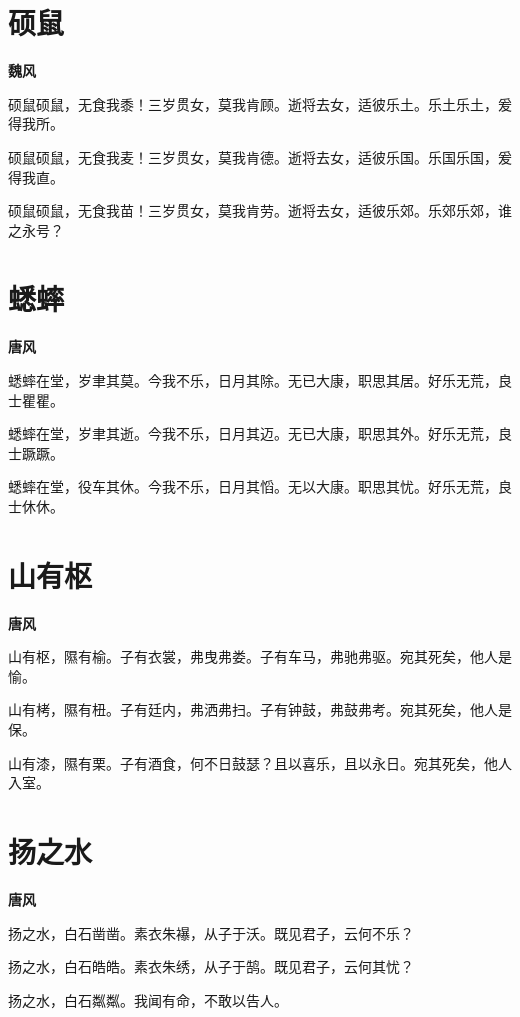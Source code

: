 \documentclass[12pt,a4paper]{ctexbook}
\begin{document}
\section{硕鼠}
\textbf{魏风}\par\vspace{0.5em}
硕鼠硕鼠，无食我黍！三岁贯女，莫我肯顾。逝将去女，适彼乐土。乐土乐土，爰得我所。\par
硕鼠硕鼠，无食我麦！三岁贯女，莫我肯德。逝将去女，适彼乐国。乐国乐国，爰得我直。\par
硕鼠硕鼠，无食我苗！三岁贯女，莫我肯劳。逝将去女，适彼乐郊。乐郊乐郊，谁之永号？\par

\section{蟋蟀}
\textbf{唐风}\par\vspace{0.5em}
蟋蟀在堂，岁聿其莫。今我不乐，日月其除。无已大康，职思其居。好乐无荒，良士瞿瞿。\par
蟋蟀在堂，岁聿其逝。今我不乐，日月其迈。无已大康，职思其外。好乐无荒，良士蹶蹶。\par
蟋蟀在堂，役车其休。今我不乐，日月其慆。无以大康。职思其忧。好乐无荒，良士休休。\par

\section{山有枢}
\textbf{唐风}\par\vspace{0.5em}
山有枢，隰有榆。子有衣裳，弗曳弗娄。子有车马，弗驰弗驱。宛其死矣，他人是愉。\par
山有栲，隰有杻。子有廷内，弗洒弗扫。子有钟鼓，弗鼓弗考。宛其死矣，他人是保。\par
山有漆，隰有栗。子有酒食，何不日鼓瑟？且以喜乐，且以永日。宛其死矣，他人入室。\par

\section{扬之水}
\textbf{唐风}\par\vspace{0.5em}
扬之水，白石凿凿。素衣朱襮，从子于沃。既见君子，云何不乐？\par
扬之水，白石皓皓。素衣朱绣，从子于鹄。既见君子，云何其忧？\par
扬之水，白石粼粼。我闻有命，不敢以告人。\par
\end{document}
